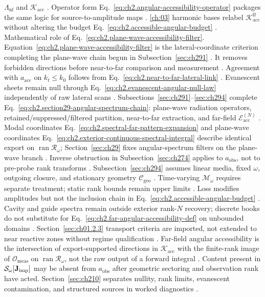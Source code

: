 \(\Lambda_{\mathrm{nf}}\) and \(\mathcal{K}_{\mathrm{acc}}\) \cite{stratton1941}. Operator form
Eq.~\eqref{eq:ch2.angular-accessibility-operator} packages the same logic for source-to-amplitude
maps \cite{harrington2001}. \ref{ch:03} harmonic bases relabel
\(\mathcal{K}_{\mathrm{acc}}^{\mathrm{ff}}\) without altering the budget
Eq.~\eqref{eq:ch2.accessible-angular-budget} \cite{stratton1941}. Mathematical role of Eq.~\eqref{eq:ch2.plane-wave-accessibility-filter}. Equation~\eqref{eq:ch2.plane-wave-accessibility-filter} is the lateral-coordinate criterion
completing the plane-wave chain begun in Subsection~\ref{sec:ch291} \cite{stratton1941}.
It removes forbidden directions before near-to-far comparison and measurement
\cite{harrington2001}. Agreement with \(a_{\mathrm{acc}}\) on \(k_t\le k_0\) follows from
Eq.~\eqref{eq:ch2.near-to-far-lateral-link} \cite{stratton1941}. Evanescent sheets remain null
through Eq.~\eqref{eq:ch2.evanescent-angular-null-law} independently of raw lateral scans
\cite{stratton1941}.
Subsections~\ref{sec:ch291}--\ref{sec:ch294} complete
Eq.~\eqref{eq:ch2.section29-angular-spectrum-chain}:
plane-wave radiation operators, retained/suppressed/filtered partition, near-to-far extraction,
and far-field $\mathcal{E}_{\mathrm{acc}}^{(N)}$ \cite{stratton1941}. Modal coordinates
Eq.~\eqref{eq:ch2.spectral-far-pattern-expansion} and plane-wave coordinates
Eq.~\eqref{eq:ch2.exterior-continuous-spectral-integral} describe identical export on
\(\operatorname{ran}\mathcal{R}_\omega\); Section~\ref{sec:ch29} fixes angular-spectrum filters on
the plane-wave branch \cite{stratton1941}. Inverse obstruction in Subsection~\ref{sec:ch274} applies to \(a_{\mathrm{obs}}\),
not to pre-probe rank transforms \cite{harrington2001}. Subsection~\ref{sec:ch294} assumes linear media, fixed \(\omega\), outgoing closure, and
stationary geometry \(\mathcal{C}_{\mathrm{geo}}\) \cite{stratton1941}.
Time-varying \(\mathcal{M}_\omega\) requires separate treatment; static rank bounds remain upper
limits \cite{stratton1941}. Loss modifies amplitudes but not the inclusion chain in
Eq.~\eqref{eq:ch2.accessible-angular-budget} \cite{stratton1941}. Cavity and guide spectra remain
outside exterior rank-$N$ recovery; discrete books do not substitute for
Eq.~\eqref{eq:ch2.far-angular-accessibility-def} on unbounded domains
\cite{jackson1999}. Section~\ref{sec:ch01.2.3} transport criteria are imported, not
extended to near reactive zones without regime qualification \cite{stratton1941}.
Far-field angular accessibility is the intersection of export-supported directions in
$\mathcal{K}_{\mathrm{acc}}$ with the finite-rank image of $\mathcal{O}_{\mathrm{meas}}$ on
$\operatorname{ran}\mathcal{R}_\omega$, not the raw output of a forward integral
\cite{harrington2001,stratton1941}. Content present in $\mathcal{S}_\omega[\mathbf{J}_{\mathrm{imp}}]$ may be absent
from $a_{\mathrm{obs}}$ after geometric sectoring and observation rank have acted.
Section~\ref{sec:ch210} separates nullity, rank limits, evanescent contamination, and structured
sources in worked diagnostics \cite{hansen1988}.
